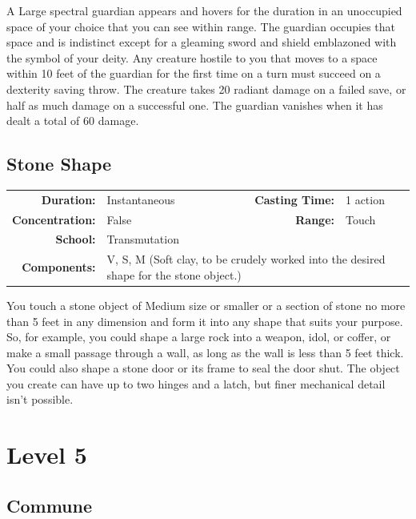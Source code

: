 \documentclass[12pt,showtrims]{memoir}
\begin{document}
\vspace{1\baselineskip}\noindent A Large spectral guardian appears and hovers for the duration in an unoccupied space of your choice that you can see within range. The guardian occupies that space and is indistinct except for a gleaming sword and shield emblazoned with the symbol of your deity. Any creature hostile to you that moves to a space within 10 feet of the guardian for the first time on a turn must succeed on a dexterity saving throw. The creature takes 20 radiant damage on a failed save, or half as much damage on a successful one. The guardian vanishes when it has dealt a total of 60 damage.

\newpage
\section*{Stone Shape}

{
\small\centering\vspace{-6pt}
\begin{tabular}{rlrl}
\toprule

\textbf{Duration:} & Instantaneous &
\textbf{Casting Time:} & 1 action \\
\textbf{Concentration:} & False &
\textbf{Range:} & Touch \\
\textbf{School:} & Transmutation \\
\textbf{Components:} & \multicolumn{3}{p{0.7\textwidth}}{V, S, M (Soft clay, to be crudely worked into the desired shape for the stone object.)}\\

\bottomrule
\end{tabular}
}

\vspace{1\baselineskip}\noindent You touch a stone object of Medium size or smaller or a section of stone no more than 5 feet in any dimension and form it into any shape that suits your purpose. So, for example, you could shape a large rock into a weapon, idol, or coffer, or make a small passage through a wall, as long as the wall is less than 5 feet thick. You could also shape a stone door or its frame to seal the door shut. The object you create can have up to two hinges and a latch, but finer mechanical detail isn't possible.

\newpage
\chapter*{Level 5} 
\section*{Commune}
\end{document}
